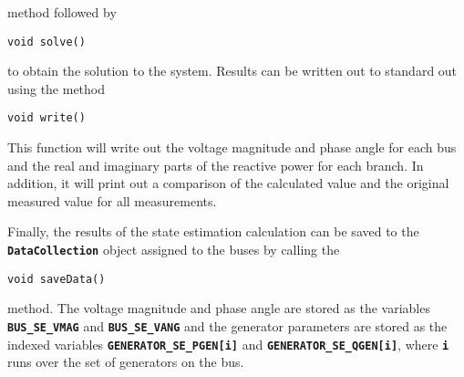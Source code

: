 method followed by

{
\color{red}
\begin{Verbatim}[fontseries=b]
void solve()
\end{Verbatim}
}

to obtain the solution to the system. Results can be written out to standard out using the method

{
\color{red}
\begin{Verbatim}[fontseries=b]
void write()
\end{Verbatim}
}

This function will write out the voltage magnitude and phase angle for each bus and the real and imaginary parts of the reactive power for each branch. In addition, it will print out a comparison of the calculated value and the original measured value for all measurements.

Finally, the results of the state estimation calculation can be saved to the \texttt{\textbf{DataCollection}} object assigned to the buses by calling the 

{
\color{red}
\begin{Verbatim}[fontseries=b]
void saveData()
\end{Verbatim}
}

method. The voltage magnitude and phase angle are stored as the variables \texttt{\textbf{BUS\_SE\_VMAG}} and \texttt{\textbf{BUS\_SE\_VANG}} and the generator parameters are stored as the indexed variables \texttt{\textbf{GENERATOR\_SE\_PGEN[i]}} and \texttt{\textbf{GENERATOR\_SE\_QGEN[i]}}, where \texttt{\textbf{i}} runs over the set of generators on the bus.
